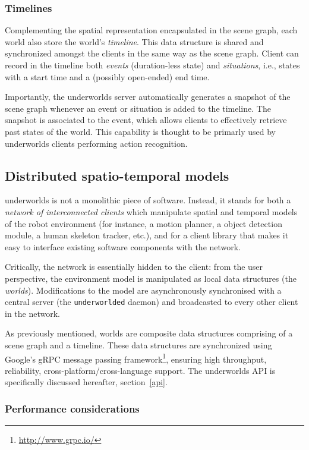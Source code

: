 \documentclass[letterpaper, 10 pt, conference]{ieeeconf}  %
\newcommand{\ie}{i.e.,\xspace}
\newcommand{\uwds}{{\sc underworlds}\xspace}
\begin{document}
\subsubsection{Timelines}

Complementing the spatial representation encapsulated in the scene graph, each
world also store the world's \emph{timeline}. This data structure is shared
and synchronized amongst the clients in the same way as the scene graph.
Client can record in the timeline both \emph{events} (duration-less state) and
\emph{situations}, \ie states with a start time and a (possibly open-ended) end time.

Importantly, the \uwds server automatically generates a snapshot of
the scene graph whenever an event or situation is added to the timeline. The
snapshot is associated to the event, which allows clients to effectively retrieve past
states of the world. This capability is thought to be primarly used by \uwds clients
performing action recognition.

\subsection{Distributed spatio-temporal models}
\label{arch}

\uwds is not a monolithic piece of software. Instead, it stands for both a
\emph{network of interconnected clients} which manipulate spatial and temporal
models of the robot environment (for instance, a motion planner, a object
detection module, a human skeleton tracker, etc.), and for a {client library}
that makes it easy to interface existing software components with the network.

Critically, the network is essentially hidden to the client: from the user
perspective, the environment model is manipulated as local data structures (the
\emph{worlds}). Modifications to the model are asynchronously synchronised with
a central server (the {\tt underworlded} daemon) and broadcasted to every other
client in the network.

As previously mentioned, worlds are composite data structures comprising of a
scene graph and a timeline. These data structures are synchronized using
Google's gRPC message passing framework\footnote{\url{http://www.grpc.io/}}, ensuring
high throughput, reliability, cross-platform/cross-language support. The \uwds
API is specifically discussed hereafter, section~\ref{api}.


\subsubsection*{Performance considerations}
\end{document}
